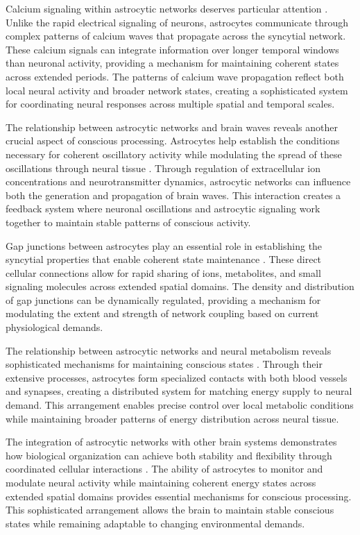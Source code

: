 \begin{refsection}
Calcium signaling within astrocytic networks deserves particular attention \cite{Bazargani2016}. Unlike the rapid electrical signaling of neurons, astrocytes communicate through complex patterns of calcium waves that propagate across the syncytial network. These calcium signals can integrate information over longer temporal windows than neuronal activity, providing a mechanism for maintaining coherent states across extended periods. The patterns of calcium wave propagation reflect both local neural activity and broader network states, creating a sophisticated system for coordinating neural responses across multiple spatial and temporal scales.

The relationship between astrocytic networks and brain waves reveals another crucial aspect of conscious processing. Astrocytes help establish the conditions necessary for coherent oscillatory activity while modulating the spread of these oscillations through neural tissue \cite{Volterra2005}. Through regulation of extracellular ion concentrations and neurotransmitter dynamics, astrocytic networks can influence both the generation and propagation of brain waves. This interaction creates a feedback system where neuronal oscillations and astrocytic signaling work together to maintain stable patterns of conscious activity.

Gap junctions between astrocytes play an essential role in establishing the syncytial properties that enable coherent state maintenance \cite{Wallraff2006}. These direct cellular connections allow for rapid sharing of ions, metabolites, and small signaling molecules across extended spatial domains. The density and distribution of gap junctions can be dynamically regulated, providing a mechanism for modulating the extent and strength of network coupling based on current physiological demands.

The relationship between astrocytic networks and neural metabolism reveals sophisticated mechanisms for maintaining conscious states \cite{Parpura2012}. Through their extensive processes, astrocytes form specialized contacts with both blood vessels and synapses, creating a distributed system for matching energy supply to neural demand. This arrangement enables precise control over local metabolic conditions while maintaining broader patterns of energy distribution across neural tissue.

The integration of astrocytic networks with other brain systems demonstrates how biological organization can achieve both stability and flexibility through coordinated cellular interactions \cite{Khakh2015}. The ability of astrocytes to monitor and modulate neural activity while maintaining coherent energy states across extended spatial domains provides essential mechanisms for conscious processing. This sophisticated arrangement allows the brain to maintain stable conscious states while remaining adaptable to changing environmental demands.


\end{refsection}
